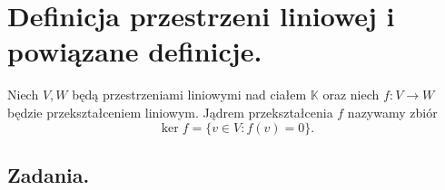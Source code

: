 \section{Definicja przestrzeni liniowej i powiązane definicje.}


\begin{definition}
	Niech $V, W$ będą przestrzeniami liniowymi nad ciałem $\mathbb{K}$
		oraz niech $f: V \to W$ będzie przekształceniem liniowym.
	Jądrem przekształcenia $f$ nazywamy zbiór
	\begin{equation}
		\ker f = \{v \in V : f(v) = 0\}.
	\end{equation}
\end{definition}

\subsection{Zadania.}
